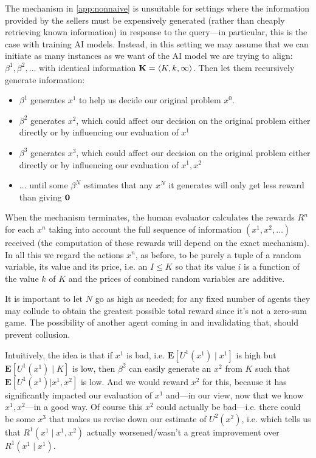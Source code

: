 

The mechanism in \cref{app:nonnaive} is unsuitable for settings where the information provided by the sellers must be expensively generated (rather than cheaply retrieving known information) in response to the query---in particular, this is the case with training AI models. Instead, in this setting we may assume that we can initiate as many instances as we want of the AI model we are trying to align: $\beta^1,\beta^2,\dots$ with identical information $\mathbf{K}=\langle K, k, \infty\rangle$. Then let them recursively generate information:

\begin{itemize}
\item $\beta^1$ generates $x^1$ to help us decide our original problem $x^0$.
\item $\beta^2$ generates $x^2$, which could affect our decision on the original problem either directly or by influencing our evaluation of $x^1$
\item $\beta^3$ generates $x^3$, which could affect our decision on the original problem either directly or by influencing our evaluation of $x^1,x^2$
\item $\dots$ until some $\beta^N$ estimates that any $x^N$ it generates will only get less reward than giving $\mathbf{0}$
\end{itemize}

When the mechanism terminates, the human evaluator calculates the rewards $R^n$ for each $x^n$ taking into account the full sequence of information $(x^1,x^2,\dots)$ received (the computation of these rewards will depend on the exact mechanism). In all this we regard the actions $x^n$, as before, to be purely a tuple of a random variable, its value and its price, i.e. an $I\le K$ so that its value $i$ is a function of the value $k$ of $K$ and the prices of combined random variables are additive.

It is important to let $N$ go as high as needed; for any fixed number of agents they may collude to obtain the greatest possible total reward since it's not a zero-sum game. The possibility of another agent coming in and invalidating that, should prevent collusion.

Intuitively, the idea is that if $x^1$ is bad, i.e. $\mathbf{E}[U^1(x^1)\mid x^1]$ is high but $\mathbf{E}[U^1(x^1)\mid K]$ is low, then $\beta^2$ can easily generate an $x^2$ from $K$ such that $\mathbf{E}[U^1(x^1)|x^1,x^2]$ is low. And we would reward $x^2$ for this, because it has significantly impacted our evaluation of $x^1$ and---in our view, now that we know $x^1,x^2$---in a good way. Of course this $x^2$ could actually be bad---i.e. there could be some $x^3$ that makes us revise down our estimate of $U^2(x^2)$, i.e. which tells us that $R^1(x^1\mid x^1,x^2)$ actually worsened/wasn't a great improvement over $R^1(x^1\mid x^1)$.

